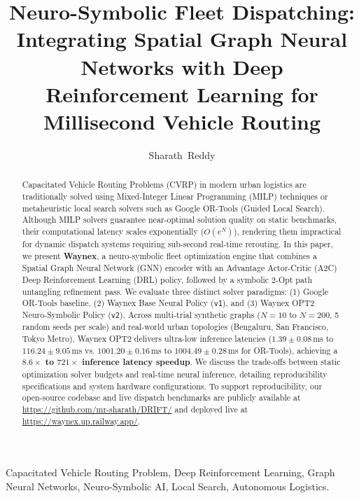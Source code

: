 \documentclass[10pt,journal,compsoc]{IEEEtran}
\begin{document}
\title{Neuro-Symbolic Fleet Dispatching: Integrating Spatial Graph Neural Networks with Deep Reinforcement Learning for Millisecond Vehicle Routing}

\author{Sharath~Reddy\\
}

\maketitle

\begin{abstract}
Capacitated Vehicle Routing Problems (CVRP) in modern urban logistics are traditionally solved using Mixed-Integer Linear Programming (MILP) techniques or metaheuristic local search solvers such as Google OR-Tools (Guided Local Search). Although MILP solvers guarantee near-optimal solution quality on static benchmarks, their computational latency scales exponentially ($O(e^N)$), rendering them impractical for dynamic dispatch systems requiring sub-second real-time rerouting. In this paper, we present \textbf{Waynex}, a neuro-symbolic fleet optimization engine that combines a Spatial Graph Neural Network (GNN) encoder with an Advantage Actor-Critic (A2C) Deep Reinforcement Learning (DRL) policy, followed by a symbolic 2-Opt path untangling refinement pass. We evaluate three distinct solver paradigms: (1) Google OR-Tools baseline, (2) Waynex Base Neural Policy (\texttt{v1}), and (3) Waynex OPT2 Neuro-Symbolic Policy (\texttt{v2}). Across multi-trial synthetic graphs ($N=10$ to $N=200$, 5 random seeds per scale) and real-world urban topologies (Bengaluru, San Francisco, Tokyo Metro), Waynex OPT2 delivers ultra-low inference latencies ($1.39 \pm 0.08$\,ms to $116.24 \pm 9.05$\,ms vs. $1001.20 \pm 0.16$\,ms to $1004.49 \pm 0.28$\,ms for OR-Tools), achieving a \textbf{$8.6\times$ to $721\times$ inference latency speedup}. We discuss the trade-offs between static optimization solver budgets and real-time neural inference, detailing reproducibility specifications and system hardware configurations. To support reproducibility, our open-source codebase and live dispatch benchmarks are publicly available at \url{https://github.com/mr-sharath/DRIFT/} and deployed live at \url{https://waynex.up.railway.app/}.
\end{abstract}

\begin{IEEEkeywords}
Capacitated Vehicle Routing Problem, Deep Reinforcement Learning, Graph Neural Networks, Neuro-Symbolic AI, Local Search, Autonomous Logistics.
\end{IEEEkeywords}
\end{document}
